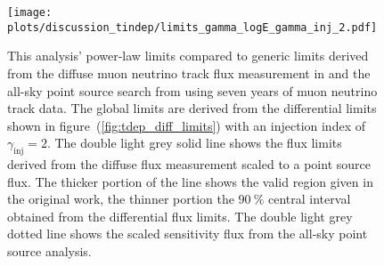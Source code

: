 \begin{figure}[htpb]
  \centering
  \texttt{[image: plots/discussion\_tindep/limits\_gamma\_logE\_gamma\_inj\_2.pdf]}
  \caption[Time-integrated analysis global power-law limits $\gamma_\text{inj}=3$]{
    This analysis' power-law limits compared to generic limits derived from the diffuse muon neutrino track flux measurement in \cite{Haack:2017dxi} and the all-sky point source search from \cite{Aartsen:2016oji} using seven years of muon neutrino track data.
    The global limits are derived from the differential limits shown in figure~(\ref{fig:tdep_diff_limits}) with an injection index of $\gamma_\text{inj}=2$.
    The double light grey solid line shows the flux limits derived from the diffuse flux measurement scaled to a point source flux.
    The thicker portion of the line shows the valid region given in the original work, the thinner portion the $\SI{90}{\percent}$ central interval obtained from the differential flux limits.
    The double light grey dotted line shows the scaled sensitivity flux from the all-sky point source analysis.
  }
  \label{fig:tdep_limits_gamma_logE_gamma_inj_2}
\end{figure}
